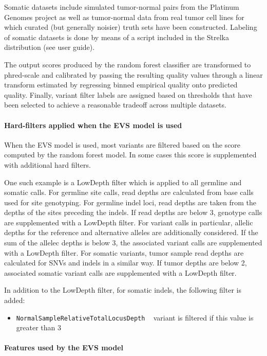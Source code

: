 \documentclass{article}
\begin{document}
Somatic datasets include simulated tumor-normal pairs from the Platinum Genomes project as well as tumor-normal data from real tumor cell lines for which curated (but generally noisier) truth sets have been constructed. Labeling of somatic datasets is done by means of a script included in the Strelka distribution (see user guide).

The output scores produced by the random forest classifier are transformed to phred-scale and calibrated by passing the resulting quality values through a linear transform estimated by regressing binned empirical quality onto predicted quality. Finally, variant filter labels are assigned based on thresholds that have been selected to achieve a reasonable tradeoff across multiple datasets.

\paragraph{Hard-filters applied when the EVS model is used}

When the EVS model is used, most variants are filtered based on the score computed by the random forest model. In some cases this score is supplemented with additional hard filters.

One such example is a LowDepth filter which is applied to all germline and somatic calls. For germline site calls, read depths are calculated from base calls used for site genotyping. For germline indel loci, read depths are taken from the depths of the sites preceding the indels. If read depths are below 3, genotype calls are supplemented with a LowDepth filter. For variant calls in particular, allelic depths for the reference and alternative alleles are additionally considered. If the sum of the allelec depths is below 3, the associated variant calls are supplemented with a LowDepth filter. For somatic variants, tumor sample read depths are calculated for SNVs and indels in a similar way. If tumor depths are below 2, associated somatic variant calls are supplemented with a LowDepth filter.

In addition to the LowDepth filter, for somatic indels, the following filter is added:

\begin{itemize}
    \item \texttt{NormalSampleRelativeTotalLocusDepth} ~ variant is filtered if this value is greater than 3
\end{itemize}


\paragraph{Features used by the EVS model}
\end{document}
